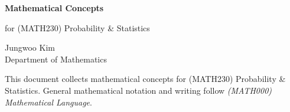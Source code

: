 \documentclass[11pt,oneside]{article}
\begin{document}
\thispagestyle{empty}

\begin{center}
    \vspace*{1.1cm}

    {\LARGE\bfseries Mathematical Concepts\par}

    \vspace{0.25cm}

    {\large for (MATH230) Probability \& Statistics\par}

    \vspace{0.75cm}

    {\normalsize
    Jungwoo Kim\\
    Department of Mathematics\\
    \PohangUniversityOfScienceAndTechnology
    \par}
\end{center}

\vspace{0.45cm}

This document collects mathematical concepts for (MATH230) Probability \& Statistics. General mathematical notation and writing follow \textit{(MATH000) Mathematical Language}.
\end{document}
